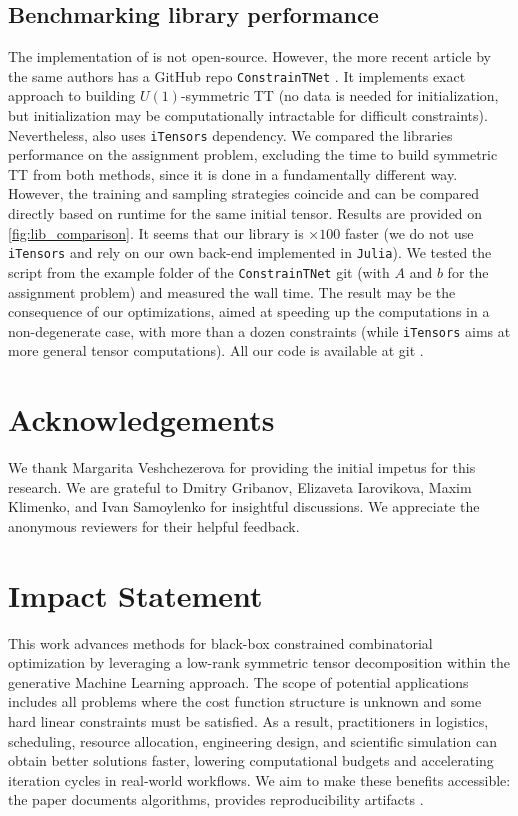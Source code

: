 \documentclass{article}
\theoremstyle{plain}
\theoremstyle{definition}
\theoremstyle{remark}
\begin{document}
\subsection{Benchmarking library performance}
\label{subsection: bench_perf_res}

The implementation of \cite{LopezPiqueres2023} is not open-source. However, the more recent article by the same authors has a GitHub repo \texttt{ConstrainTNet} \cite{ConstrainTNet2024}. It implements exact approach to building $U(1)$-symmetric TT (no data is needed for initialization, but initialization may be computationally intractable for difficult constraints). Nevertheless, \cite{ConstrainTNet2024} also uses \texttt{iTensors} \cite{ITensor} dependency. We compared the libraries performance on the assignment problem, excluding the time to build symmetric TT from both methods, since it is done in a fundamentally different way. However, the training and sampling strategies coincide and can be compared directly based on runtime for the same initial tensor. Results are provided on \cref{fig:lib_comparison}. 
It seems that our library is $\times 100$ faster (we do not use \texttt{iTensors} and rely on our own back-end implemented in \texttt{Julia}). We tested the script from the example folder of the \texttt{ConstrainTNet} git \cite{ConstrainTNetQuadraticKnapsack2024} (with $A$ and $b$ for the assignment problem) and measured the wall time. The result may be the consequence of our optimizations, aimed at speeding up the computations in a non-degenerate case, with more than a dozen constraints (while \texttt{iTensors} aims at more general tensor computations). All our code is available at git \cite{OhMyU1_2026}.

\section{Acknowledgements}
We thank Margarita Veshchezerova for providing the initial impetus for this research. We are grateful to Dmitry Gribanov, Elizaveta Iarovikova, Maxim Klimenko, and Ivan Samoylenko for insightful discussions. We appreciate the anonymous reviewers for their helpful feedback.

\section{Impact Statement}
This work advances methods for black-box constrained combinatorial optimization by leveraging a low-rank symmetric tensor decomposition within the generative Machine Learning approach. The scope of potential applications includes all problems where the cost function structure is unknown and some hard linear constraints must be satisfied. As a result, practitioners in logistics, scheduling, resource allocation, engineering design, and scientific simulation can obtain better solutions faster, lowering computational budgets and accelerating iteration cycles in real‑world workflows. We aim to make these benefits accessible: the paper documents algorithms, provides reproducibility artifacts \cite{OhMyU1_2026}.
\end{document}
